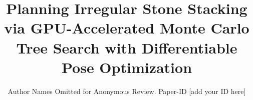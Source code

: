 \documentclass[conference]{IEEEtran}
\begin{document}
\title{Planning Irregular Stone Stacking via GPU-Accelerated Monte Carlo Tree Search with Differentiable Pose Optimization}

\author{Author Names Omitted for Anonymous Review. Paper-ID [add your ID here]}





% 


\maketitle
\end{document}
